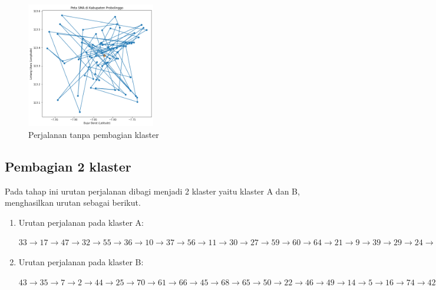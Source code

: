 \begin{figure}[H]
\centering
\includegraphics[width=0.5\textwidth]{Gambar/hasil_mtsp/1}
\caption{Perjalanan tanpa pembagian klaster}
\label{fig:hasil_mtsp1}
\end{figure}

\subsection{Pembagian 2 klaster}

Pada tahap ini urutan perjalanan dibagi menjadi 2 klaster yaitu klaster A dan B, menghasilkan urutan sebagai berikut.

\begin{enumerate}
\item Urutan perjalanan pada klaster A:

$
33 \rightarrow 17 \rightarrow 47 \rightarrow 32 \rightarrow 55 \rightarrow 36 \rightarrow 10 \rightarrow 37 \rightarrow 56 \rightarrow 11 \rightarrow 30 \rightarrow 27 \rightarrow 59 \rightarrow 60 \rightarrow 64 \rightarrow 21 \rightarrow 9 \rightarrow 39 \rightarrow 29 \rightarrow 24 \rightarrow 63 \rightarrow 72 \rightarrow 13 \rightarrow 6 \rightarrow 38 \rightarrow 52
$

\item Urutan perjalanan pada klaster B:

\noindent $
43 \rightarrow 35 \rightarrow 7 \rightarrow 2 \rightarrow 44 \rightarrow 25 \rightarrow 70 \rightarrow 61 \rightarrow 66 \rightarrow 45 \rightarrow 68 \rightarrow 65 \rightarrow 50 \rightarrow 22 \rightarrow 46 \rightarrow 49 \rightarrow 14 \rightarrow 5 \rightarrow 16 \rightarrow 74 \rightarrow 42 \rightarrow 8 \rightarrow 48 \rightarrow 31 \rightarrow 26 \rightarrow 18 \rightarrow 54 \rightarrow 40 \rightarrow 58 \rightarrow 67 \rightarrow 15 \rightarrow 12 \rightarrow 57 \rightarrow 20 \rightarrow 34 \rightarrow 69 \rightarrow 75 \rightarrow 41 \rightarrow 23 \rightarrow 51 \rightarrow 19 \rightarrow 28 \rightarrow 1 \rightarrow 62 \rightarrow 4 \rightarrow 53 \rightarrow 3 \rightarrow 71 \rightarrow 73
$
\end{enumerate}

